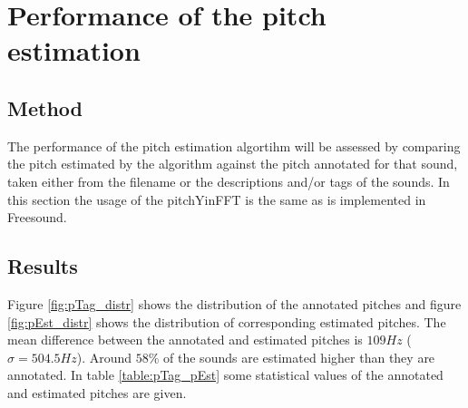 \documentclass{proc}
\begin{document}
\section{Performance of the pitch estimation}
\subsection{Method}
The performance of the pitch estimation algortihm will be assessed by comparing the pitch estimated by the algorithm against the pitch annotated for that sound, taken either from the filename or the descriptions and/or tags of the sounds. In this section the usage of the pitchYinFFT is the same as is implemented in Freesound. 

\subsection{Results}
Figure \ref{fig:pTag_distr} shows the distribution of the annotated pitches and figure \ref{fig:pEst_distr} shows the distribution of corresponding estimated pitches. The mean difference between the annotated and estimated pitches is $109Hz$ ($\sigma = 504.5Hz$). Around $58\%$ of the sounds are estimated higher than they are annotated. In table \ref{table:pTag_pEst} some statistical values of the annotated and estimated pitches are given.
\end{document}
